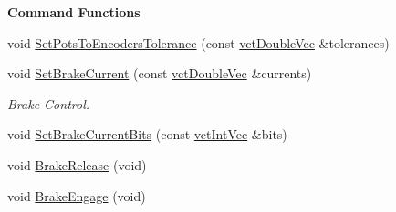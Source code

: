 \begin{Indent}{\bf Command Functions}
\begin{DoxyCompactItemize}
void \hyperlink{classsaw_robot_i_o1394_1_1osa_robot1394_a25f45f1a866d1802da011d9c3b1fbfff}{Set\-Pots\-To\-Encoders\-Tolerance} (const \hyperlink{vct_dynamic_vector_types_8h_ade4b3068c86fb88f41af2e5187e491c2}{vct\-Double\-Vec} \&tolerances)
\item 
void \hyperlink{classsaw_robot_i_o1394_1_1osa_robot1394_a91d3f75e7f86defc1d85737f956e9b11}{Set\-Brake\-Current} (const \hyperlink{vct_dynamic_vector_types_8h_ade4b3068c86fb88f41af2e5187e491c2}{vct\-Double\-Vec} \&currents)
\begin{DoxyCompactList}\small\item\em Brake Control. \end{DoxyCompactList}\item 
void \hyperlink{classsaw_robot_i_o1394_1_1osa_robot1394_a9607d876dad522b0e8accf672083a073}{Set\-Brake\-Current\-Bits} (const \hyperlink{vct_dynamic_vector_types_8h_a47260df0b570a25352b3f318ed0b4c4e}{vct\-Int\-Vec} \&bits)
\item 
void \hyperlink{classsaw_robot_i_o1394_1_1osa_robot1394_ac82ce11beb6adad4783fb0f988fb6559}{Brake\-Release} (void)
\item 
void \hyperlink{classsaw_robot_i_o1394_1_1osa_robot1394_ad782e0761f93901333bc49b795f96f40}{Brake\-Engage} (void)
\end{DoxyCompactItemize}
\end{Indent}
